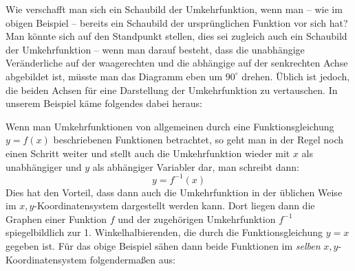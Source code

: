 \begin{center}
\end{center}

Wie verschafft man sich ein Schaubild der Umkehrfunktion, wenn man -- wie im obigen Beispiel -- bereits ein Schaubild der ursprünglichen Funktion vor sich hat? Man könnte sich auf den Standpunkt stellen, dies sei zugleich auch ein Schaubild der Umkehrfunktion -- wenn man darauf besteht, dass die unabhängige Veränderliche auf der waagerechten und die abhängige auf der senkrechten Achse abgebildet ist, müsste man das Diagramm eben um $90^\circ$ drehen. Üblich ist jedoch, die beiden Achsen für eine Darstellung der Umkehrfunktion zu vertauschen. In unserem Beispiel käme folgendes dabei heraus:

\begin{center}
\end{center}

Wenn man Umkehrfunktionen von allgemeinen durch eine Funktionsgleichung $y = f(x)$ beschriebenen Funktionen betrachtet, so geht man in der Regel noch einen Schritt weiter und stellt auch die Umkehrfunktion wieder mit $x$ als unabhängiger und $y$ als abhängiger Variabler dar, man schreibt dann:
\[ y = f^{-1}(x) \]
Dies hat den Vorteil, dass dann auch die Umkehrfunktion in der üblichen Weise im $x,y$-Koordinatensystem dargestellt werden kann. Dort liegen dann die Graphen einer Funktion $f$ und der zugehörigen Umkehrfunktion $f^{-1}$ spiegelbildlich zur 1. Winkelhalbierenden, die durch die Funktionsgleichung $y = x$ gegeben ist. Für das obige Beispiel sähen dann beide Funktionen im \emph{selben} $x,y$-Koordinatensystem folgendermaßen aus:

